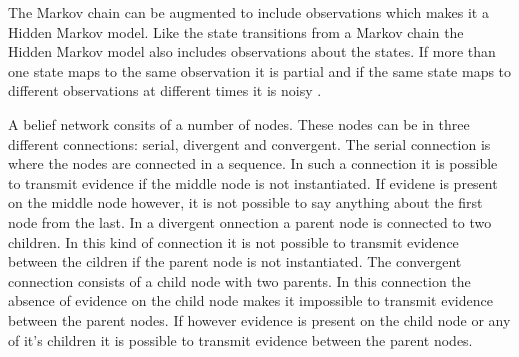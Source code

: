 The Markov chain can be augmented to include observations which makes it a
Hidden Markov model. Like the state transitions from a Markov chain the Hidden
Markov model also includes observations about the states. If more than one state
maps to the same observation it is partial and if the same state maps to
different observations at different times it is noisy \citep[6.5.2]{MIBook}.\nl 
% 
% 

 A belief network consits of a number of nodes. These nodes can be in three
 different connections: serial, divergent and convergent. The serial
 connection is where the nodes are connected in a sequence. In such a connection
 it is possible to transmit evidence if the middle node is not instantiated. If
 evidene is present on the middle node however, it is not possible to say anything about the first node from the last.
 In a divergent onnection a parent node is connected to two children. In this
 kind of connection it is not possible to transmit evidence between the cildren
 if the parent node is not instantiated.
 The convergent connection  consists of a child node with two parents. In this
 connection the absence of evidence on the child node makes it impossible to
 transmit evidence between the parent nodes. If however evidence is present on
 the child node or any of it's children it is possible to transmit evidence
 between the parent nodes.\nl
 
